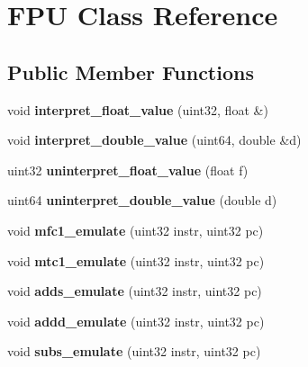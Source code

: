 \hypertarget{classFPU}{
\section{FPU Class Reference}
\label{classFPU}
}
\subsection*{Public Member Functions}
\begin{DoxyCompactItemize}
\item 
\hypertarget{classFPU_a358d735dc50060c3eb2d416e8d6d8ff7}{
void {\bfseries interpret\_\-float\_\-value} (uint32, float \&)}
\label{classFPU_a358d735dc50060c3eb2d416e8d6d8ff7}

\item 
\hypertarget{classFPU_a4e2113932d665c4e45d7e88c63ddde36}{
void {\bfseries interpret\_\-double\_\-value} (uint64, double \&d)}
\label{classFPU_a4e2113932d665c4e45d7e88c63ddde36}

\item 
\hypertarget{classFPU_a0d9e4de6caf810ebc70e5494f154c99b}{
uint32 {\bfseries uninterpret\_\-float\_\-value} (float f)}
\label{classFPU_a0d9e4de6caf810ebc70e5494f154c99b}

\item 
\hypertarget{classFPU_a5318f58aa92a78c76b309f4a7f5c48a6}{
uint64 {\bfseries uninterpret\_\-double\_\-value} (double d)}
\label{classFPU_a5318f58aa92a78c76b309f4a7f5c48a6}

\item 
\hypertarget{classFPU_aef477ba456ce9008c3ae7e09072b02ed}{
void {\bfseries mfc1\_\-emulate} (uint32 instr, uint32 pc)}
\label{classFPU_aef477ba456ce9008c3ae7e09072b02ed}

\item 
\hypertarget{classFPU_ad0c56d545fee64d72cccdec95fad89af}{
void {\bfseries mtc1\_\-emulate} (uint32 instr, uint32 pc)}
\label{classFPU_ad0c56d545fee64d72cccdec95fad89af}

\item 
\hypertarget{classFPU_a54474473a52874ff909713e0091c3112}{
void {\bfseries adds\_\-emulate} (uint32 instr, uint32 pc)}
\label{classFPU_a54474473a52874ff909713e0091c3112}

\item 
\hypertarget{classFPU_a973f43b95694b7b27c8db702350a1ce6}{
void {\bfseries addd\_\-emulate} (uint32 instr, uint32 pc)}
\label{classFPU_a973f43b95694b7b27c8db702350a1ce6}

\item 
\hypertarget{classFPU_a8f755a58d7463db6324e093fc9f83fa7}{
void {\bfseries subs\_\-emulate} (uint32 instr, uint32 pc)}
\label{classFPU_a8f755a58d7463db6324e093fc9f83fa7}


\end{DoxyCompactItemize}
